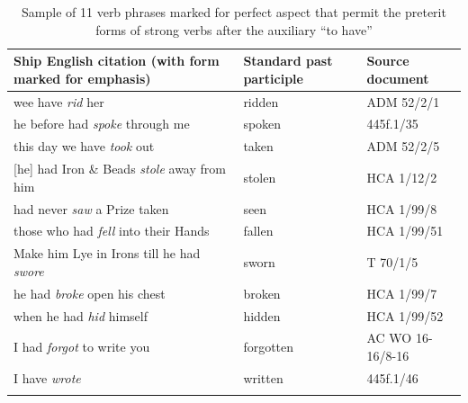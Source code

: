 \begin{table}
\caption{\label{tab:key:6.2} Sample of 11 verb phrases marked for perfect aspect that permit the preterit forms of strong verbs after the auxiliary “to have”}
\small
\begin{tabularx}{\textwidth}{Qp{20mm}l}
\lsptoprule

\textbf{Ship English citation}\newline 
(with  form marked for emphasis) & \textbf{Standard past participle} & \textbf{Source document}\\
\midrule 
wee have \textit{rid} her & ridden & ADM 52/2/1\\
he before had \textit{spoke} through me & spoken & 445f.1/35\\
this day we have \textit{took} out & taken & ADM 52/2/5\\{}
[he] had Iron \& Beads \textit{stole} away from him & stolen & HCA 1/12/2\\
had never \textit{saw} a Prize taken & seen & HCA 1/99/8\\
those who had \textit{fell} into their Hands & fallen & HCA 1/99/51\\
Make him Lye in Irons till he had \textit{swore} & sworn & T 70/1/5\\
he had \textit{broke} open his chest & broken & HCA 1/99/7\\
when he had \textit{hid} himself & hidden & HCA 1/99/52\\
I had \textit{forgot} to write you & forgotten & AC WO 16-16/8-16\\
I have \textit{wrote} & written & 445f.1/46\\
\lspbottomrule
\end{tabularx}\end{table}


